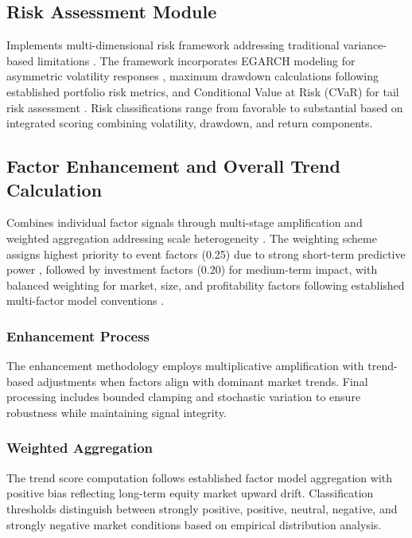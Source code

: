 \documentclass[3p,times,procedia]{elsarticle}
\begin{document}
\subsection{{Risk Assessment Module}}

Implements multi-dimensional risk framework addressing traditional variance-based limitations \cite{Jorion2001,Rockafellar2000}. The framework incorporates EGARCH modeling for asymmetric volatility responses \cite{Nelson1991}, maximum drawdown calculations following established portfolio risk metrics, and Conditional Value at Risk (CVaR) for tail risk assessment \cite{Rockafellar2000}. Risk classifications range from favorable to substantial based on integrated scoring combining volatility, drawdown, and return components.

\subsection{{Factor Enhancement and Overall Trend Calculation}}

Combines individual factor signals through multi-stage amplification and weighted aggregation addressing scale heterogeneity \cite{Harvey2016,FAMA1993}. The weighting scheme assigns highest priority to event factors (0.25) due to strong short-term predictive power \cite{Daniel1998}, followed by investment factors (0.20) for medium-term impact, with balanced weighting for market, size, and profitability factors following established multi-factor model conventions \cite{FAMA1993,Carhart1997}.

\subsubsection{{Enhancement Process}}

The enhancement methodology employs multiplicative amplification with trend-based adjustments when factors align with dominant market trends. Final processing includes bounded clamping and stochastic variation to ensure robustness while maintaining signal integrity.

\subsubsection{{Weighted Aggregation}}

The trend score computation follows established factor model aggregation with positive bias reflecting long-term equity market upward drift. Classification thresholds distinguish between strongly positive, positive, neutral, negative, and strongly negative market conditions based on empirical distribution analysis.
\end{document}
